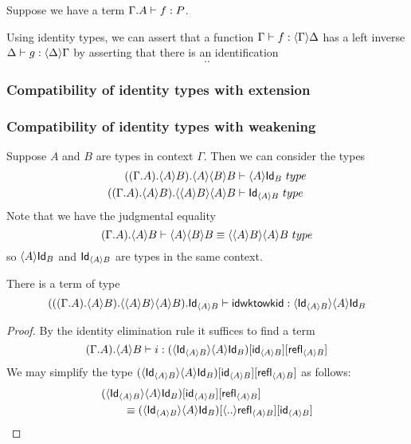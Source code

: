 Suppose we have a term $\jterm{\ctxext{\Gamma}{A}}{P}{f}$. 

Using identity types, we can assert that a function $\jhom{\Gamma}{\Delta}{f}$ has
a left inverse $\jhom{\Delta}{\Gamma}{g}$ by asserting that there is an identification
\begin{equation*}
..
\end{equation*}

\subsubsection{Compatibility of identity types with extension}

\subsubsection{Compatibility of identity types with weakening}
Suppose $A$ and $B$ are types in context $\Gamma$. Then we can consider the types
\begin{align*}
\jtype*{\ctxext{{{\Gamma}{A}}{\ctxwk{A}{B}}}{\ctxwk{A}{{B}{B}}}}{\ctxwk{A}{\idtypevar{B}}}\\
\jtype*{\ctxext{{{\Gamma}{A}}{\ctxwk{A}{B}}}{\ctxwk{{A}{B}}{{A}{B}}}}{\idtypevar{\ctxwk{A}{B}}}
\end{align*}
Note that we have the judgmental equality
\begin{equation*}
\jtypeeq
  {\ctxext{{\Gamma}{A}}{\ctxwk{A}{B}}}
  {\ctxwk{A}{{B}{B}}}
  {\ctxwk{{A}{B}}{{A}{B}}}
\end{equation*}
so $\ctxwk{A}{\idtypevar{B}}$ and $\idtypevar{\ctxwk{A}{B}}$ are types in the
same context. 

\begin{lem}
There is a term of type
\begin{equation*}
\jterm
  {\ctxext{{{{\Gamma}{A}}{\ctxwk{A}{B}}}{\ctxwk{{A}{B}}{{A}{B}}}}{\idtypevar{\ctxwk{A}{B}}}}
  {\ctxwk{\idtypevar{\ctxwk{A}{B}}}{\ctxwk{A}{\idtypevar{B}}}}
  {\typefont{idwktowkid}}
\end{equation*}
\end{lem}

\begin{proof}
By the identity elimination rule it suffices to find a term
\begin{equation*}
\jterm
  {\ctxext{{\Gamma}{A}}{\ctxwk{A}{B}}}
  {\subst{\refl{\ctxwk{A}{B}}}{{\idfunc[\ctxwk{A}{B}]}{\ctxwk{\idtypevar{\ctxwk{A}{B}}}{\ctxwk{A}{\idtypevar{B}}}}}}
  {i}
\end{equation*}
We may simplify the type $\subst{\refl{\ctxwk{A}{B}}}{{\idfunc[\ctxwk{A}{B}]}{\ctxwk{\idtypevar{\ctxwk{A}{B}}}{\ctxwk{A}{\idtypevar{B}}}}}$ as follows:
\begin{align*}
& \subst{\refl{\ctxwk{A}{B}}}{{\idfunc[\ctxwk{A}{B}]}{\ctxwk{\idtypevar{\ctxwk{A}{B}}}{\ctxwk{A}{\idtypevar{B}}}}}\\
& \qquad\jdeq \subst{\idfunc[\ctxwk{A}{B}]}{{\ctxwk{..}{\refl{\ctxwk{A}{B}}}}{\ctxwk{\idtypevar{\ctxwk{A}{B}}}{\ctxwk{A}{\idtypevar{B}}}}}
\end{align*}
\end{proof}

